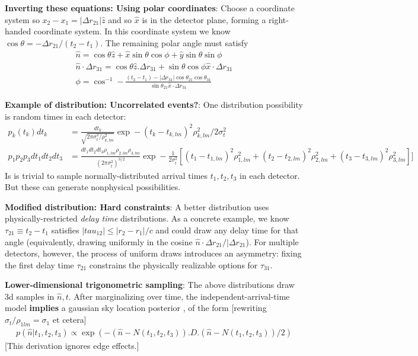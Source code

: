\documentclass[twocolumn,prd,nofootinbib]{revtex4}
\begin{document}
\begin{widetext}
{\begin{shaded}
\noindent \textbf{Inverting these equations: Using polar coordinates}: Choose a coordinate system so $x_2-x_1 =|\Delta
r_{21}| \hat{z}$ and so $\hat{x}$ is in the detector plane, forming a right-handed coordinate system.  In this coordinate system we know $\cos \theta = -\Delta r_{21}/(t_2-t_1)$.  The remaining polar angle
must satisfy 
\begin{eqnarray}
\hat{n} = \cos \theta \hat{z} + \hat{x}\sin\theta \cos \phi + \hat{y} \sin\theta \sin\phi \\
\hat{n}\cdot \Delta r_{31} =  \cos \theta \hat{z}.\Delta r_{31} + \sin \theta \cos \phi \hat{x} \cdot \Delta r_{31} \\
\phi = \cos^{-1} - \frac{(t_3-t_1)  - |\Delta r_{31}| \cos \theta_{21}\cos \theta_{31} }{ \sin \theta_{21}  \hat{x}\cdot
  \Delta r_{31}}
\end{eqnarray}

\end{shaded}

\begin{shaded}
\noindent \textbf{Example of distribution: Uncorrelated events?}: One distribution possibility is random times in each detector:
\begin{align}
p_k(t_k) dt_k &= \frac{dt_k}{\sqrt{2\pi  \sigma_t^2/\rho_{k,lm}^2}} \exp - (t_k - t_{k,lm})^2 \rho_{k,lm}^2/2\sigma_t^2 \\
p_1 p_2 p_3 dt_1 dt_2 dt_3 &= \frac{dt_1 dt_2 dt_3 \rho_{1,lm}\rho_{2,lm}\rho_{3,lm}}{(2\pi \sigma_t^2)^{3/2}}
 \exp - \frac{1}{2\sigma_t^2}\left[ (t_1 - t_{1,lm})^2 \rho_{1,lm}^2 + (t_2 - t_{2,lm})^2 \rho_{2,lm}^2 + (t_3 -
   t_{3,lm})^2 \rho_{3,lm}^2 \right]]
\end{align}
Is is trivial to sample normally-distributed  arrival times $t_1,t_2,t_3$ in each detector.  But these can generate
nonphysical possibilities.

\noindent \textbf{Modified distribution: Hard constraints}: A better distribution uses physically-restricted \emph{delay
  time} distributions.  As a concrete example, we know  $\tau_{21}\equiv t_2-t_1$ satisfies $|tau_{12}| \le |r_2
-r_1|/c$ and could draw any delay time for that angle (equivalently, drawing uniformly in the cosine $\hat{n}\cdot
\Delta r_{21}/|\Delta r_{21}$).  For multiple detectors, however, the process of uniform draws introduces an asymmetry:
fixing the first delay time $\tau_{21}$ constrains the physically realizable options for $\tau_{31}$.
\end{shaded}


\noindent \textbf{Lower-dimensional trigonometric sampling}:  The above distributions draw 3d samples in $\hat{n},t$.
After marginalizing over time, the independent-arrival-time model \textbf{implies} a gaussian sky location posterior
\cite{2011CQGra..28j5021F}, of the form [rewriting $\sigma_t/\rho_{1lm} = \sigma_1$ et cetera]
\begin{eqnarray}
p(\hat{n}|t_1,t_2,t_3) \propto \exp(- (\hat{n}-N(t_1,t_2,t_3)).D.(\hat{n}-N(t_1,t_2,t_3))/2)
\end{eqnarray}
[This derivation ignores edge effects.]

}
\end{widetext}
\end{document}
